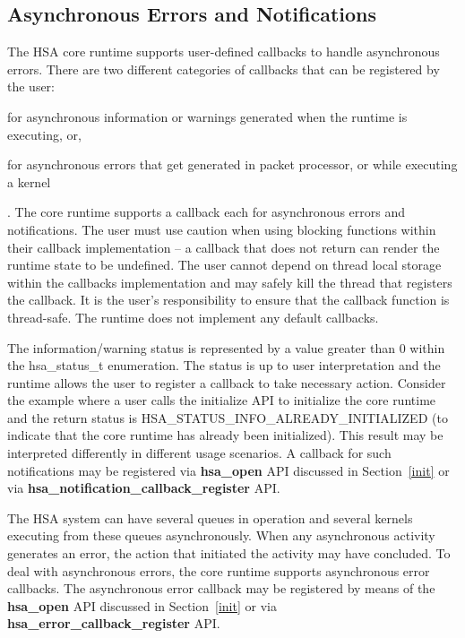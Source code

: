\documentclass[draft]{book}
\newcommand{\mariotodo}[1]{\todo[color=CarnationPink]{#1}}
\newcommand{\reffun}[1]{\textbf{#1}}
\newcommand{\reftyp}[1]{#1}
\newcommand{\refenu}[1]{\reftyp{#1}}
\begin{document}
\hypertarget{asyncerror}{}\subsection{Asynchronous Errors and
Notifications}\label{asyncerror}

The HSA core runtime supports user-defined callbacks to handle asynchronous
errors. There are two different \mariotodo{why separating them?} categories of
callbacks that can be registered by the user:\begin{inparaenum}[(i)]\item for
  asynchronous information or warnings generated when the runtime is executing,
  or, \item for asynchronous errors that get generated in packet processor, or
  while executing a kernel \end{inparaenum}. The core runtime supports a
callback each for asynchronous errors and notifications. The user must use
caution when using blocking functions within their callback implementation -- a
callback that does not return can render the runtime state to be undefined. The
user cannot depend on thread local storage within the callbacks implementation
and may safely kill the thread that registers the callback. It is the user's
responsibility to ensure that the callback function is thread-safe. The runtime
does not implement any default callbacks.

The information/warning status is represented by a value greater than 0 within
the \reftyp{hsa_status_t} enumeration. The status is up to user interpretation
and the runtime allows the user to register a callback to take necessary
action. Consider the example where a user calls the initialize API to initialize
the core runtime and the return status is
\refenu{HSA_STATUS_INFO_ALREADY_INITIALIZED} (to indicate that the core
runtime has already been initialized). This result may be interpreted
differently in different usage scenarios. A callback for such notifications may
be registered via \reffun{hsa_open} API discussed in Section~\ref{init} or via
\reffun{hsa_notification_callback_register} API.

The HSA system can have several queues in operation and several kernels
executing from these queues asynchronously. When any asynchronous activity
generates an error, the action that initiated the activity may have
concluded. To deal with asynchronous errors, the core runtime supports
asynchronous error callbacks. The asynchronous error callback may be registered
by means of the \reffun{hsa_open} API discussed in Section~\ref{init} or via
\reffun{hsa_error_callback_register} API.
\end{document}
